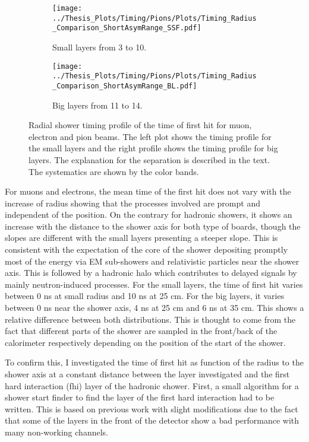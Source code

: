 \begin{figure}[htbp!]
	\begin{subfigure}[t]{0.5\textwidth}
		\centering
		\texttt{[image: ../Thesis\_Plots/Timing/Pions/Plots/Timing\_Radius\_Comparison\_ShortAsymRange\_SSF.pdf]}
		\caption{Small layers from 3 to 10.}\label{fig:Radius_Comparison_SSF}
	\end{subfigure}
	\hfill
	\begin{subfigure}[t]{0.5\textwidth}
		\centering
		\texttt{[image: ../Thesis\_Plots/Timing/Pions/Plots/Timing\_Radius\_Comparison\_ShortAsymRange\_BL.pdf]}
		\caption{Big layers from 11 to 14.}\label{fig:Radius_Comparison_BL}
	\end{subfigure}
	\caption{Radial shower timing profile of the time of first hit for muon, electron and pion beams. The left plot shows the timing profile for the small layers and the right profile shows the timing profile for big layers. The explanation for the separation is described in the text. The systematics are shown by the color bands.}
	\label{fig:RadialTiming}
\end{figure}

For muons and electrons, the mean time of the first hit does not vary with the increase of radius showing that the processes involved are prompt and independent of the position. On the contrary for hadronic showers, it shows an increase with the distance to the shower axis for both type of boards, though the slopes are different with the small layers presenting a steeper slope. This is consistent with the expectation of the core of the shower depositing promptly most of the energy via EM sub-showers and relativistic particles near the shower axis. This is followed by a hadronic halo which contributes to delayed signals by mainly neutron-induced processes. For the small layers, the time of first hit varies between 0 ns at small radius and 10 ns at 25 cm. For the big layers, it varies between 0 ns near the shower axis, 4 ns at 25 cm and 6 ns at 35 cm. This shows a relative difference between both distributions. This is thought to come from the fact that different parts of the shower are sampled in the front/back of the calorimeter respectively depending on the position of the start of the shower.

To confirm this, I investigated the time of first hit as function of the radius to the shower axis at a constant distance between the layer investigated and the first hard interaction (\acrshort{fhi}) layer of the hadronic shower. First, a small algorithm for a shower start finder to find the layer of the first hard interaction had to be written. This is based on previous work \cite{CaN026} with slight modifications due to the fact that some of the layers in the front of the detector show a bad performance with many non-working channels.

